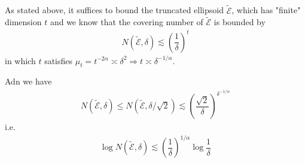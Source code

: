 \documentclass[11pt,a4paper]{ctexart}
\numberwithin{equation}{section}%
\begin{document}
\subsection{}

As stated above, it suffices to bound the truncated ellipsoid $ \tilde{\mathcal{E}} $, which has "finite" dimension $ t $ and we know that the covering number of $ \tilde{\mathcal{E}} $ is bounded by
\begin{align*}
    N(\tilde{\mathcal{E}},\delta  ) \lesssim \left( \dfrac{ 1 }{\delta  } \right)^{t}
\end{align*}
in which $ t $ satisfies $ \mu _t = t^{-2\alpha } \asymp \delta   ^2  \Rightarrow t \asymp \delta   ^{-1/\alpha }  $.

Adn we have
\begin{align*}
    N(\tilde{\mathcal{E}},\delta  ) \leq N(\tilde{\mathcal{E}},\delta /\sqrt{2} ) \lesssim \left( \dfrac{ \sqrt{2} }{ \delta  } \right)^{\delta  ^{-1/\alpha }}
\end{align*}
i.e.
\begin{align*}
    \log N(\tilde{\mathcal{E}},\delta  ) \lesssim \left(\dfrac{ 1 }{ \delta   } \right)^{ 1/\alpha } \log \dfrac{ 1 }{ \delta  }
\end{align*}











    




    
\end{document}
